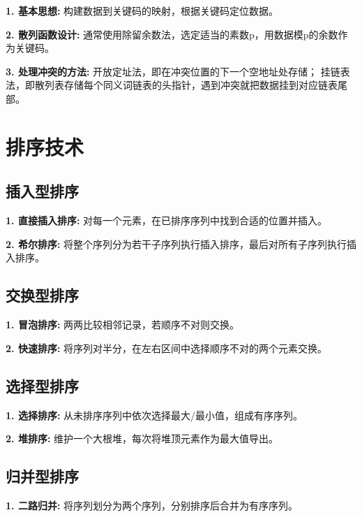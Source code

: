 \textbf{1. 基本思想: }构建数据到关键码的映射，根据关键码定位数据。

\textbf{2. 散列函数设计: }通常使用除留余数法，选定适当的素数p，用数据模p的余数作为关键码。

\textbf{3. 处理冲突的方法: }开放定址法，即在冲突位置的下一个空地址处存储； 挂链表法，即散列表存储每个同义词链表的头指针，遇到冲突就把数据挂到对应链表尾部。

\section{排序技术}

\subsection{插入型排序}

\textbf{1. 直接插入排序: }对每一个元素，在已排序序列中找到合适的位置并插入。

\textbf{2. 希尔排序: }将整个序列分为若干子序列执行插入排序，最后对所有子序列执行插入排序。

\subsection{交换型排序}

\textbf{1. 冒泡排序: }两两比较相邻记录，若顺序不对则交换。

\textbf{2. 快速排序: }将序列对半分，在左右区间中选择顺序不对的两个元素交换。

\subsection{选择型排序}

\textbf{1. 选择排序: }从未排序序列中依次选择最大/最小值，组成有序序列。

\textbf{2. 堆排序: }维护一个大根堆，每次将堆顶元素作为最大值导出。

\subsection{归并型排序}

\textbf{1. 二路归并: }将序列划分为两个序列，分别排序后合并为有序序列。

